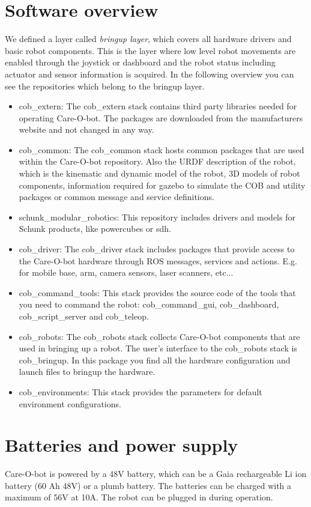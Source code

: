 \section{Software overview}\label{sec:software_overview}
We defined a layer called \textit{bringup layer}, which covers all hardware drivers and basic robot components. This is the layer where low level robot movements are enabled through the joystick or dashboard and the robot status including actuator and sensor information is acquired. In the following overview you can see the repositories which belong to the bringup layer.
\begin{itemize}
\item {cob\_extern}: The cob\_extern stack contains third party libraries needed for operating Care-O-bot. The packages are downloaded from the manufacturers website and not changed in any way.
\item {cob\_common}: The cob\_common stack hosts common packages that are used within the Care-O-bot repository. Also the URDF description of the robot, which is the kinematic and dynamic model of the robot, 3D models of robot components, information required for gazebo to simulate the COB and utility packages or common message and service definitions.
\item schunk\_modular\_robotics: This repository includes drivers and models for Schunk products, like powercubes or sdh.
\item cob\_driver: The cob\_driver stack includes packages that provide access to the Care-O-bot hardware through ROS messages, services and actions. E.g. for mobile base, arm, camera sensors, laser scanners, etc...
\item cob\_command\_tools: This stack provides the source code of the tools that you need to command the robot: cob\_command\_gui, cob\_dashboard, cob\_script\_server and cob\_teleop.
\item cob\_robots:  The cob\_robots stack collects Care-O-bot components that are used in bringing up a robot. The user's interface to the cob\_robots stack is cob\_bringup. In this package you find all the hardware configuration and launch files to bringup the hardware.
\item cob\_environments: This stack provides the parameters for default environment configurations.
\end{itemize}

\section{Batteries and power supply}
Care-O-bot is powered by a 48V battery, which can be a Gaia rechargeable Li ion battery (60 Ah 48V) or a plumb battery. The batteries can be charged with a maximum of 56V at 10A. The robot can be plugged in during operation.

